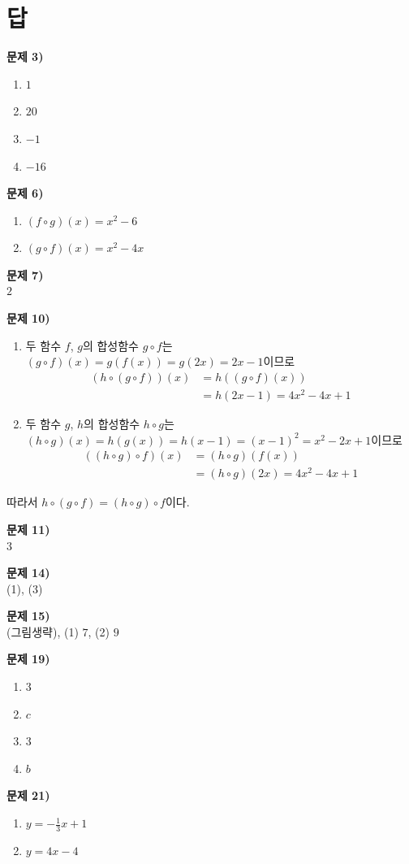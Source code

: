 \documentclass{oblivoir}
\newcounter{num}
\newcommand\an[1]{\par\bigskip\noindent\textbf{문제 #1)}\\}
\let\oldsection\section
\renewcommand\section{\clearpage\oldsection}
\begin{document}
\section*{답}

\begin{minipage}{0.49\textwidth}
%
\an{3}
\begin{enumerate}[topsep=0pt]
\item
\(1\)
\item
\(20\)
\item
\(-1\)
\item
\(-16\)
\end{enumerate}

%
\an{6}
\begin{enumerate}[topsep=0pt]
\item
\((f\circ g)(x)=x^2-6\)
\item
\((g\circ f)(x)=x^2-4x\)
\end{enumerate}

%
\an{7}
\(2\)

%
\an{10}
\begin{enumerate}[topsep=0pt]
\item
두 함수 \(f\), \(g\)의 합성함수 \(g\circ f\)는\\
\((g\circ f)(x)=g(f(x))=g(2x)=2x-1\)이므로
\begin{align*}
(h\circ(g\circ f))(x)
&=h((g\circ f)(x))\\
&=h(2x-1)=4x^2-4x+1
\end{align*}
\item
두 함수 \(g\), \(h\)의 합성함수 \(h\circ g\)는\\
\((h\circ g)(x)=h(g(x))=h(x-1)=(x-1)^2=x^2-2x+1\)이므로
\begin{align*}
((h\circ g)\circ f)(x)
&=(h\circ g)(f(x))\\
&=(h\circ g)(2x)=4x^2-4x+1
\end{align*}
\end{enumerate}
\end{minipage}
\begin{minipage}{0.49\textwidth}
따라서 \(h\circ(g\circ f)=(h\circ g)\circ f\)이다.

%
\an{11}
\(3\)

%
\an{14}
(1), (3)

%
\an{15}
(그림생략), (1) \(7\), (2) \(9\)

%
\an{19}
\begin{enumerate}[topsep=0pt]
\item
\(3\)
\item
\(c\)
\item
\(3\)
\item
\(b\)
\end{enumerate}

%
\an{21}
\begin{enumerate}[topsep=0pt]
\item
\(y=-\frac13x+1\)
\item
\(y=4x-4\)
\end{enumerate}
\end{minipage}
\end{document}
